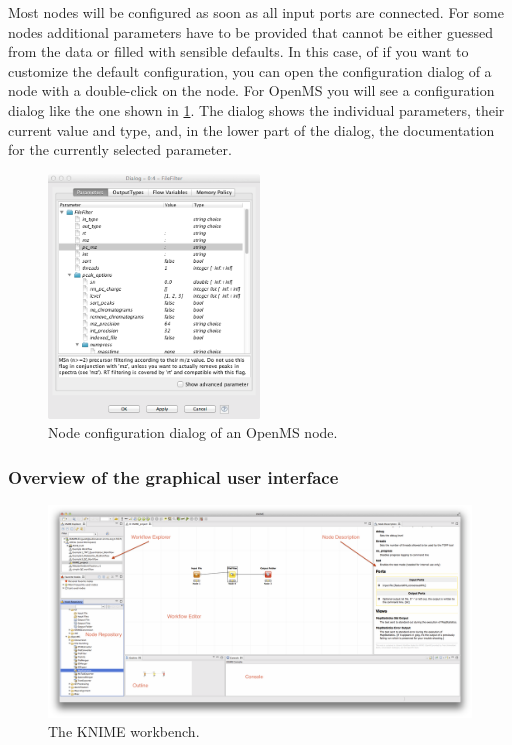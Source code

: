 Most nodes will be configured as soon as all input ports are connected.
For some nodes additional parameters have to be provided that cannot be either guessed from the data or filled with sensible defaults.
In this case, of if you want to customize the default configuration, you can open the configuration dialog of a node with a double-click on the node.
For OpenMS you will see a configuration dialog like the one shown in \cref{fig:knime_configure}.
The dialog shows the individual parameters, their current value and type, and, in the lower part of the dialog, the documentation for the currently selected parameter.

\begin{figure}
\centering
\includegraphics[width=0.5\textwidth]{graphics/knime_setup/knime_configure_dialog}
\caption{Node configuration dialog of an OpenMS node.}
\label{fig:knime_configure}
\end{figure}

\subsubsection{Overview of the graphical user interface}

\begin{figure}
\includegraphics[width=\textwidth]{graphics/knime_setup/knime_workbench_marked}
\caption{The KNIME workbench.}
\label{fig:knime_workbench}
\end{figure}

